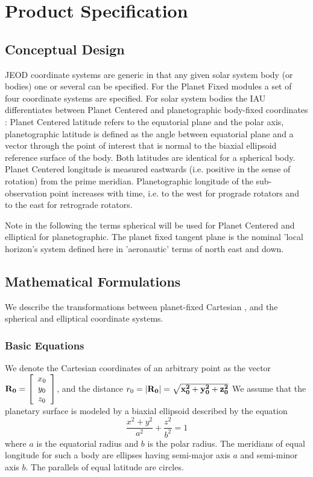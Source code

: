 \documentclass[twoside,11pt,titlepage]{report}
\begin{document}
\chapter{Product Specification}\label{ch:spec}

\section{Conceptual Design}
JEOD coordinate systems are generic in that any given solar system body (or bodies) one or several can be specified.
For the Planet Fixed modules a set of four coordinate systems are specified.
For solar system bodies the IAU differentiates between Planet Centered and planetographic body-fixed coordinates : Planet Centered latitude refers to the equatorial plane and the polar axis, planetographic latitude is defined as the angle between equatorial plane and a vector through the point of interest that is normal to the biaxial ellipsoid reference surface of the body. Both latitudes are identical for a spherical body. Planet Centered longitude is measured eastwards (i.e. positive in the sense of rotation) from the prime meridian. Planetographic longitude of the sub-observation point increases with time, i.e. to the west for prograde rotators and to the east for retrograde rotators.

Note in the following the terms spherical will be used for Planet Centered and elliptical for planetographic. The planet
fixed tangent plane is the nominal 'local horizon's system defined here in 'aeronautic' terms of north east and down.

\section{Mathematical Formulations}
We describe the transformations between planet-fixed Cartesian , and the spherical and elliptical coordinate systems.

\subsection{Basic Equations}
We denote the Cartesian coordinates
of an arbitrary point as the vector  $\bf{R_0} = \left[\begin{array}{c}x_0 \\ y_0 \\z_0\end{array}\right]$,
and the distance $r_0 = |\bf{R_0}| = \sqrt{x_0^2+y_0^2+z_0^2}$
We assume that the planetary surface is modeled by a biaxial ellipsoid described by the equation
\begin{equation}
\frac{x^2+y^2}{a^2} + \frac{z^2}{b^2} = 1
\label{spheroid}
\end{equation}
\noindent where $a$ is the equatorial radius and $b$ is the polar radius.  The meridians of equal longitude  for such a body are ellipses having semi-major axis $a$ and semi-minor axis $b$. The parallels of equal latitude are circles.
\end{document}

